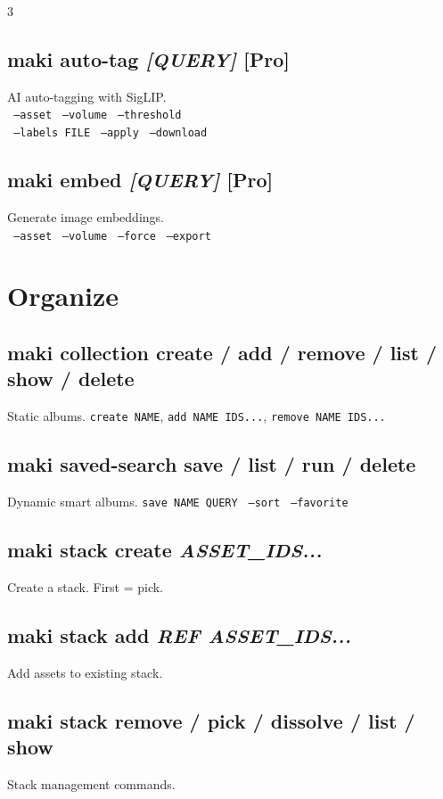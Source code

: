 \documentclass[a4paper,landscape,8pt]{article}
\newcommand{\cmd}[1]{\texttt{\footnotesize #1}}
\newcommand{\opt}[1]{\texttt{\scriptsize\color{maki-stone} #1}}
\newcommand{\pro}{\textcolor{maki-teal}{\scriptsize [Pro]}}
\begin{document}
\begin{multicols}{3}
\subsection{maki auto-tag \textit{[QUERY]} \pro}
AI auto-tagging with SigLIP. \\
\opt{--asset} \opt{--volume} \opt{--threshold} \\
\opt{--labels FILE} \opt{--apply} \opt{--download}

\subsection{maki embed \textit{[QUERY]} \pro}
Generate image embeddings. \\
\opt{--asset} \opt{--volume} \opt{--force} \opt{--export}

\section{Organize}

\subsection{maki collection create / add / remove / list / show / delete}
Static albums. \cmd{create NAME}, \cmd{add NAME IDS...}, \cmd{remove NAME IDS...}

\subsection{maki saved-search save / list / run / delete}
Dynamic smart albums. \cmd{save NAME QUERY} \opt{--sort} \opt{--favorite}

\subsection{maki stack create \textit{ASSET\_IDS...}}
Create a stack. First = pick.

\subsection{maki stack add \textit{REF ASSET\_IDS...}}
Add assets to existing stack.

\subsection{maki stack remove / pick / dissolve / list / show}
Stack management commands.


\end{multicols}
\end{document}
